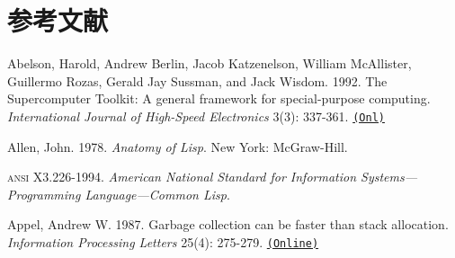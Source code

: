 \documentclass[oneside]{book}
\newcommand{\acronym}[1]{\textsc{\MakeLowercase{#1}}}
\newcommand{\code}[1]{\texttt{#1}}
\begin{document}

\mainmatter














\backmatter

\chapter*{参考文献}
\label{References}

 \label{Abelson et al. 1992}
Abelson, Harold, Andrew Berlin, Jacob Katzenelson, William McAllister,
Guillermo Rozas, Gerald Jay Sussman, and Jack Wisdom. 1992.  The Supercomputer
Toolkit: A general framework for special-purpose computing.
\textit{International Journal of High-Speed Electronics} 3(3): 337-361.
\href{http://www.hpl.hp.com/techreports/94/HPL-94-30.html}{\code{(Onl)}}

 \label{Allen 1978}
Allen, John.  1978.  \textit{Anatomy of Lisp}. New York: McGraw-Hill.

 \label{ANSI 1994}
\acronym{ANSI} X3.226-1994. \textit{American National Standard for Information
Sys\-tems---Programming Language---Common Lisp}.

 \label{Appel 1987}
Appel, Andrew W.  1987.  Garbage collection can be faster than stack
allocation.  \textit{Information Processing Letters} 25(4): 275-279.
\href{http://citeseer.ist.psu.edu/viewdoc/summary?doi=10.1.1.39.8219}{\code{(Online)}}
\end{document}
